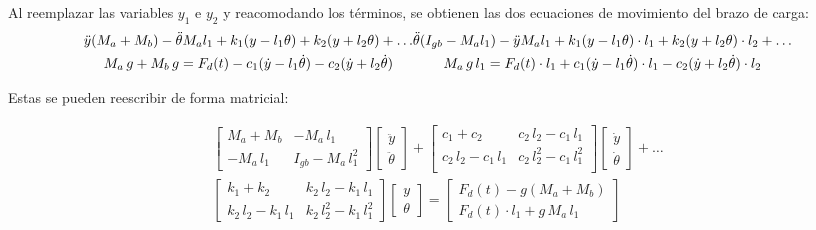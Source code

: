 Al reemplazar las variables $y_1$ e $y_2$ y reacomodando los términos, se obtienen las dos ecuaciones de movimiento del brazo de carga:
\begin{subequations}
\begin{multline}\label{eq:mov_y}
	\ddot{y}(M_a + M_b) - \ddot{\theta}M_al_1 + k_1(y - l_1\theta) + k_2(y + l_2\theta) + \dots \\
	 M_a\, g + M_b\, g = F_d(t) - c_1(\dot{y} - l_1\dot{\theta}) - c_2(\dot{y} + l_2\dot{\theta}) 
\end{multline} 
\vspace{-17mm}
\begin{multline}\label{eq:mov_theta}
	\ddot{\theta}(I_{gb} - M_al_1) - \ddot{y}M_al_1 + k_1(y - l_1\theta)\cdot l_1 + k_2(y + l_2\theta)\cdot l_2 + \dots \\
	M_a\, g\, l_1 = F_d(t)\cdot l_1 + c_1(\dot{y} - l_1\dot{\theta})\cdot l_1 - c_2(\dot{y} + l_2\dot{\theta})\cdot l_2 
\end{multline}
\end{subequations}

Estas se pueden reescribir de forma matricial:

\begin{equation}\label{eq:mov_matriz}
\begin{split}
\begin{bmatrix}
	M_a + M_b	& -M_a\,l_1 \\
	-M_a\,l_1	& I_{gb} - M_a\,l_1^2
\end{bmatrix}
\begin{bmatrix}
	\ddot{y}\\
	\ddot{\theta}
\end{bmatrix} +
\begin{bmatrix}
	c_1 + c_2			& c_2\,l_2 - c_1\,l_1\\
	c_2\,l_2 - c_1\,l_1	& c_2\,l_2^2 - c_1\,l_1^2\\
\end{bmatrix}
\begin{bmatrix}
	\dot{y}\\
	\dot{\theta}
\end{bmatrix} + \dots \\
\begin{bmatrix}
	k_1 + k_2			& k_2\,l_2 - k_1\,l_1\\
	k_2\,l_2 - k_1\,l_1	& k_2\,l_2^2 - k_1\,l_1^2
\end{bmatrix}
\begin{bmatrix}
	y\\
	\theta
\end{bmatrix} =
\begin{bmatrix}
	F_d(t) - g(M_a + M_b)\\
	F_d(t)\cdot l_1 + g\,M_a\,l_1
\end{bmatrix}
\end{split}
\end{equation}

